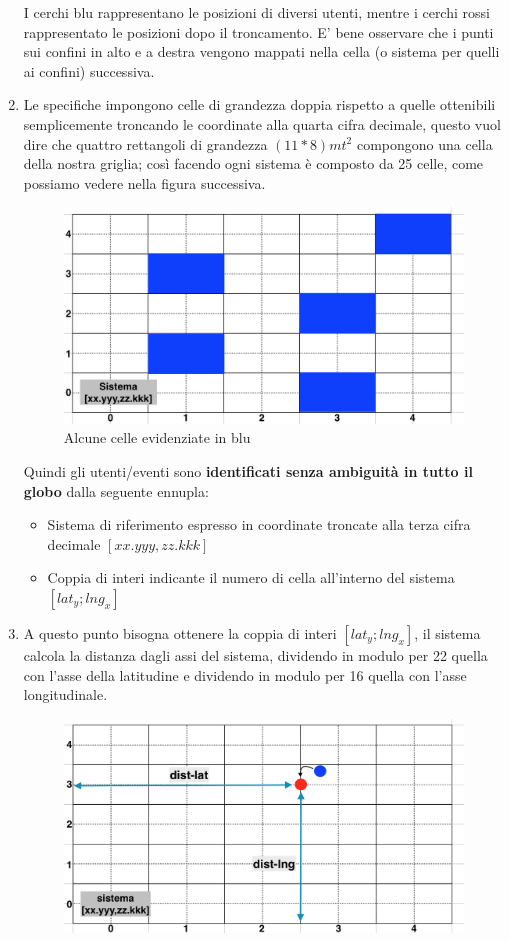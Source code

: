 \begin{enumerate}
I cerchi blu rappresentano le posizioni di diversi utenti, mentre i cerchi rossi rappresentato le posizioni dopo il troncamento. E' bene osservare che i punti sui confini in alto e a destra vengono mappati nella cella (o sistema per quelli ai confini) successiva.
\newpage
\item Le specifiche impongono celle di grandezza doppia rispetto a quelle ottenibili semplicemente troncando le coordinate alla quarta cifra decimale, questo vuol dire che quattro rettangoli di grandezza $(11*8)mt^{2}$ compongono una cella della nostra griglia; così facendo ogni sistema è composto da 25 celle, come possiamo vedere nella figura successiva.
\begin{figure}[H]
	\centering
	\includegraphics[scale=0.6]{Implementazione/celle.png}
	\caption{Alcune celle evidenziate in blu}
	\label{fig:celle}
\end{figure}
Quindi gli utenti/eventi sono \textbf{identificati senza ambiguità in tutto il globo} dalla seguente ennupla:
\begin{itemize}
\label{tupla}
\item Sistema di riferimento espresso in coordinate troncate alla terza cifra decimale $[xx.yyy,zz.kkk]$
\item Coppia di interi indicante il numero di cella all'interno del sistema  $[lat_y;lng_x]$
\end{itemize} 
\newpage
\item A questo punto bisogna ottenere la coppia di interi $[lat_y;lng_x]$, il sistema calcola la distanza dagli assi del sistema, dividendo in modulo per 22 quella con l'asse della latitudine e dividendo in modulo per 16 quella con l'asse longitudinale.
\begin{figure}[H]
	\centering
	\includegraphics[scale=0.6]{Implementazione/dist.png}

\end{figure}
\end{enumerate}

